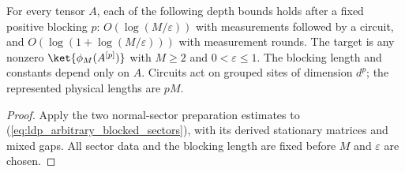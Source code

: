 \begin{lemma}
    \label{lem:ldp_arbitrary_blocked_measurement}
    \leanok
    For every tensor $A$, each of the following depth bounds holds after a
    fixed positive blocking $p$: $O(\log(M/\varepsilon))$ with measurements
    followed by a circuit, and $O(\log(1+\log(M/\varepsilon)))$ with
    measurement rounds. The target is any nonzero
    $\ket{\phi_M(A^{[p]})}$ with $M\geq2$ and $0<\varepsilon\leq1$.
    The blocking length and constants depend only on $A$. Circuits act on
    grouped sites of dimension $d^p$; the represented physical lengths are $pM$.
\end{lemma}
\begin{proof}
    \leanok
    Apply the two normal-sector preparation estimates to
    (\ref{eq:ldp_arbitrary_blocked_sectors}), with its derived stationary
    matrices and mixed gaps. All sector data and the blocking length are
    fixed before $M$ and $\varepsilon$ are chosen.
\end{proof}


